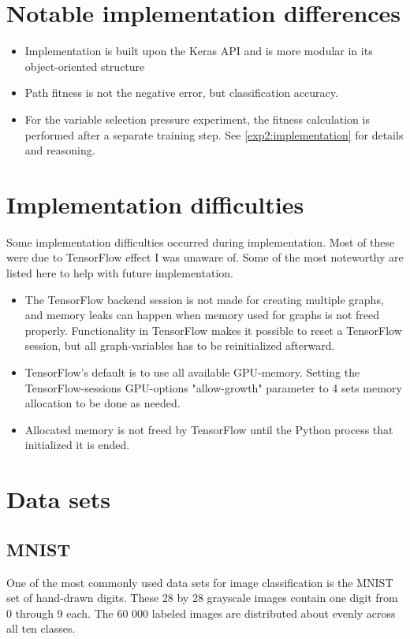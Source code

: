 \section{Notable implementation differences}
\begin{itemize}
    \item Implementation is built upon the Keras API and is more modular in its object-oriented structure
    \item Path fitness is not the negative error, but classification accuracy. 
    \item For the variable selection pressure experiment, the fitness calculation is performed after a separate training step. See \ref{exp2:implementation} for details and reasoning.
\end{itemize}

\section{Implementation difficulties} 
\label{implementation:problems}
Some implementation difficulties occurred during implementation. Most of these were due to TensorFlow effect I was unaware of. Some of the most noteworthy are listed here to help with future implementation.
\begin{itemize}
    \item The TensorFlow backend session is not made for creating multiple graphs, and memory leaks can happen when memory used for graphs is not freed properly. Functionality in TensorFlow makes it possible to reset a TensorFlow session, but all graph-variables has to be reinitialized afterward. 
    \item TensorFlow's default is to use all available GPU-memory. Setting the TensorFlow-sessions GPU-options "allow-growth" parameter to 4 sets memory allocation to be done as needed.
    \item Allocated memory is not freed by TensorFlow until the Python process that initialized it is ended.
\end{itemize}

\section{Data sets}
\subsection{MNIST}\label{Implementation:MNIST}
One of the most commonly used data sets for image classification is the MNIST\cite{MNIST} set of hand-drawn digits. These 28 by 28 grayscale images contain one digit from 0 through 9 each. The 60 000  labeled images are distributed about evenly across all ten classes. 

